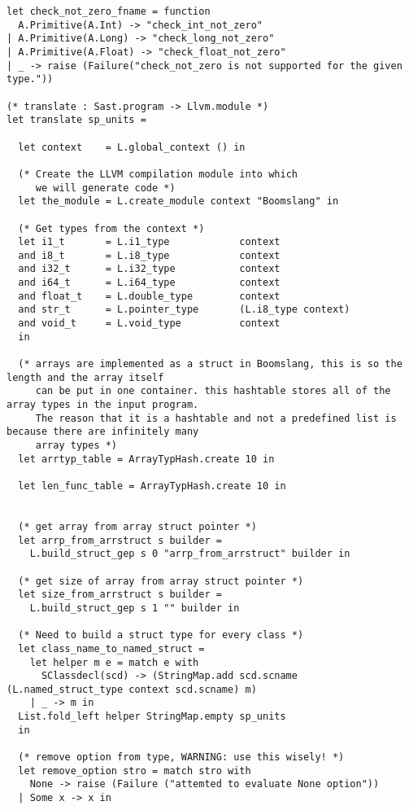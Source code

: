 \documentclass{article}
\begin{document}
\begin{verbatim}
let check_not_zero_fname = function
  A.Primitive(A.Int) -> "check_int_not_zero"
| A.Primitive(A.Long) -> "check_long_not_zero"
| A.Primitive(A.Float) -> "check_float_not_zero"
| _ -> raise (Failure("check_not_zero is not supported for the given type."))

(* translate : Sast.program -> Llvm.module *)
let translate sp_units =

  let context    = L.global_context () in
  
  (* Create the LLVM compilation module into which
     we will generate code *)
  let the_module = L.create_module context "Boomslang" in

  (* Get types from the context *)
  let i1_t       = L.i1_type            context
  and i8_t       = L.i8_type            context
  and i32_t      = L.i32_type           context
  and i64_t      = L.i64_type           context
  and float_t    = L.double_type        context
  and str_t      = L.pointer_type       (L.i8_type context)
  and void_t     = L.void_type          context
  in

  (* arrays are implemented as a struct in Boomslang, this is so the length and the array itself
     can be put in one container. this hashtable stores all of the array types in the input program.
     The reason that it is a hashtable and not a predefined list is because there are infinitely many
     array types *)
  let arrtyp_table = ArrayTypHash.create 10 in
  
  let len_func_table = ArrayTypHash.create 10 in


  (* get array from array struct pointer *)
  let arrp_from_arrstruct s builder =
    L.build_struct_gep s 0 "arrp_from_arrstruct" builder in
  
  (* get size of array from array struct pointer *)
  let size_from_arrstruct s builder =
    L.build_struct_gep s 1 "" builder in

  (* Need to build a struct type for every class *)
  let class_name_to_named_struct =
    let helper m e = match e with
      SClassdecl(scd) -> (StringMap.add scd.scname (L.named_struct_type context scd.scname) m)
    | _ -> m in
  List.fold_left helper StringMap.empty sp_units
  in
  
  (* remove option from type, WARNING: use this wisely! *) 
  let remove_option stro = match stro with
    None -> raise (Failure ("attemted to evaluate None option"))
  | Some x -> x in


\end{verbatim}
\end{document}
